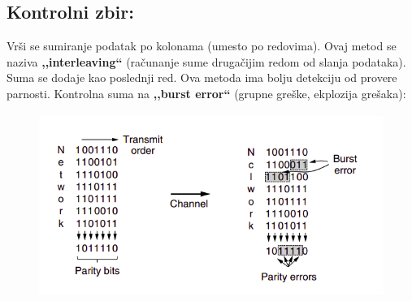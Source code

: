 \documentclass[a4paper]{article}
\begin{document}
    \subsection{Kontrolni zbir: } Vrši se sumiranje podatak po kolonama (umesto po redovima).
    Ovaj metod se naziva \textbf{,,interleaving``} (računanje sume drugačijim redom od slanja podataka).
    Suma se dodaje kao poslednji red. Ova metoda ima bolju detekciju od provere parnosti.
    Kontrolna suma na \textbf{,,burst error``} (grupne greške, ekplozija grešaka):
    \begin{figure}[H]
    \begin{center}
        \includegraphics[width=120mm,height=60mm]{Slike/detekcija1.png}
    \end{center}
    \end{figure}
\end{document}
